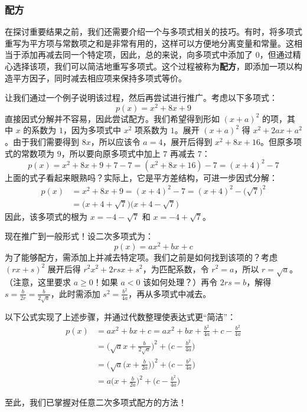 \subsubsection*{配方}

在探讨重要结果之前，我们还需要介绍一个与多项式相关的技巧。有时，将多项式重写为平方项与常数项之和是非常有用的，这样可以方便地分离变量和常量。这相当于添加再减去同一个特定项，因此，总的来说，向多项式中添加了 $0$，但通过精心选择该项，我们可以简洁地重写多项式。这个过程被称为\textbf{配方}，即添加一项以构造平方因子，同时减去相应项来保持多项式等价。

让我们通过一个例子说明该过程，然后再尝试进行推广。考虑以下多项式：
\[p(x) = x^2 + 8x + 9\]
直接因式分解并不容易，因此尝试配方。我们希望得到形如 $(x + a)^2$ 的项，其中 $x$ 的系数为 $1$，因为多项式中 $x^2$ 项系数为 $1$。展开 $(x + a)^2$ 得 $x^2 + 2ax + a^2$。由于我们需要得到 $8x$，所以应该令 $a = 4$，展开后得到 $x^2 + 8x + 16$。但原多项式的常数项为 $9$，所以要向原多项式中加上 $7$ 再减去 $7$：
\[p(x) = x^2 + 8x + 9 + 7 - 7 = (x^2 + 8x + 16) - 7 = (x + 4)^2 - 7\]
上面的式子看起来眼熟吗？实际上，它是平方差结构，可进一步因式分解：
\begin{align*}
    p(x) &= x^2 + 8x + 9 = (x + 4)^2 - 7 = (x + 4)^2 - \Big(\sqrt 7\Big)^2 \\
    &= \Big(x+4+\sqrt 7\Big)\Big(x+4-\sqrt 7\Big)
\end{align*}
因此，该多项式的根为 $x=-4-\sqrt 7$ 和 $x=-4+\sqrt 7$。

现在推广到一般形式！设二次多项式为：
\[p(x) = ax^2 + bx + c\]
为了能够配方，需添加上并减去特定项。我们之前是如何找到该项的？考虑 $(rx + s)^2$ 展开后得 $r^2x^2 + 2rsx + s^2$，为匹配系数，令 $r^2 = a$，所以 $r = \sqrt{a}$。（注意，这里要求 $a \ge 0$！如果 $a<0$ 该如何处理？）再令 $2rs = b$，解得 $s = \frac{b}{2r} = \frac{b}{2\sqrt{a}}$，此时需添加 $s^2 = \frac{b^2}{4a}$，再从多项式中减去。

以下公式实现了上述步骤，并通过代数整理使表达式更``简洁''：
\begin{align*}
    p(x) &= ax^2 + bx + c = ax^2 + bx + \frac{b^2}{4a} + c - \frac{b^2}{4a}\\
    &=\Big(\sqrt{a}x+\frac{b}{2\sqrt{a}}\Big)^2+\Big(c- \frac{b^2}{4a}\Big)\\
    &=\Bigg(\sqrt{a}\Big(x+\frac{b}{2a}\Big)\Bigg)^2+\Big(c- \frac{b^2}{4a}\Big)\\
    &=a\Big(x+\frac{b}{2a}\Big)^2+\Big(c- \frac{b^2}{4a}\Big)
\end{align*}

至此，我们已掌握对任意二次多项式配方的方法！

